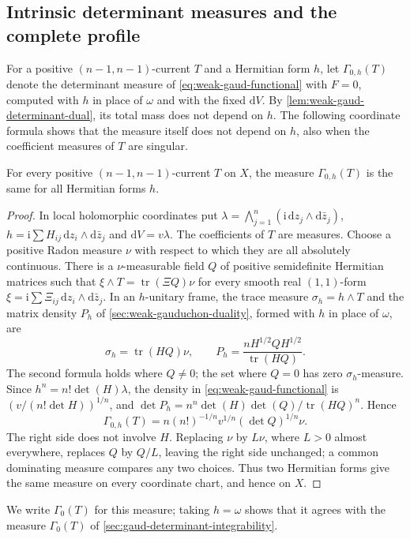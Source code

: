 \subsection{Intrinsic determinant measures and the complete profile}

For a positive $(n-1,n-1)$-current $T$ and a Hermitian form $h$, let $\Gamma_{0,h}(T)$ denote the determinant measure of \eqref{eq:weak-gaud-functional} with $F=0$, computed with $h$ in place of $\omega$ and with the fixed $\mathrm dV$. By \cref{lem:weak-gaud-determinant-dual}, its total mass does not depend on $h$. The following coordinate formula shows that the measure itself does not depend on $h$, also when the coefficient measures of $T$ are singular.

\begin{lemma}\label{lem:gaud-determinant-measure-intrinsic}
For every positive $(n-1,n-1)$-current $T$ on $X$, the measure
$\Gamma_{0,h}(T)$ is the same for all Hermitian forms $h$.
\end{lemma}
\begin{proof}
In local holomorphic coordinates put
$\lambda=\bigwedge_{j=1}^n(\mathrm i\,\mathrm dz_j\wedge\mathrm d\bar z_j)$,
$h=\mathrm i\sum H_{ij}\,\mathrm dz_i\wedge\mathrm d\bar z_j$ and $\mathrm dV=v\lambda$.
The coefficients of $T$ are measures. Choose a positive
Radon measure $\nu$ with respect to which they are all absolutely continuous. There is a
$\nu$-measurable field $Q$ of positive semidefinite Hermitian matrices such that
$\xi\wedge T=\operatorname{tr}(\Xi Q)\nu$ for every smooth real $(1,1)$-form
$\xi=\mathrm i\sum\Xi_{ij}\,\mathrm dz_i\wedge\mathrm d\bar z_j$. In an $h$-unitary frame, the trace measure $\sigma_h=h\wedge T$ and the matrix density $P_h$ of \cref{sec:weak-gauduchon-duality}, formed with $h$ in place of $\omega$, are
\[
 \sigma_h=\operatorname{tr}(HQ)\nu,\qquad
 P_h=\frac{nH^{1/2}QH^{1/2}}{\operatorname{tr}(HQ)}.
\]
The second formula holds where $Q\ne0$; the set where $Q=0$ has zero $\sigma_h$-measure.
Since $h^n=n!\det(H)\lambda$, the density in \eqref{eq:weak-gaud-functional} is $(v/(n!\det H))^{1/n}$, and $\det P_h=n^n\det(H)\det(Q)/\operatorname{tr}(HQ)^n$. Hence
\begin{equation}\label{eq:intrinsic-gaud-determinant-coordinate}
 \Gamma_{0,h}(T)
 =n(n!)^{-1/n}v^{1/n}(\det Q)^{1/n}\nu.
\end{equation}
The right side does not involve $H$. Replacing $\nu$ by $L\nu$, where
$L>0$ almost everywhere, replaces $Q$ by $Q/L$, leaving the
right side unchanged; a common dominating measure compares any two choices. Thus two Hermitian forms give the same measure on every coordinate chart, and hence on $X$.
\end{proof}
We write $\Gamma_0(T)$ for this measure; taking $h=\omega$ shows that it agrees with the measure $\Gamma_0(T)$ of \cref{sec:gaud-determinant-integrability}.


